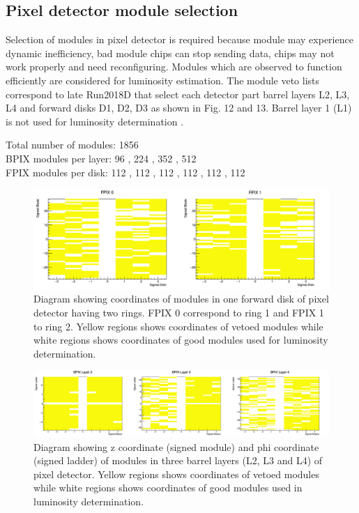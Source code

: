 \subsection{Pixel detector module selection}
Selection of modules in pixel detector is required because module may experience dynamic inefficiency, bad module chips can stop sending data, chips may not work properly and need reconfiguring. Modules which are observed to function efficiently are considered for luminosity estimation. The module veto lists correspond to late Run2018D that select each detector part barrel layers L2, L3, L4 and forward disks D1, D2, D3 as shown in Fig. 12 and 13. Barrel layer 1 (L1) is not used for luminosity determination \cite{vetolist}. \\

\begin{flushleft}
Total number of modules: 1856 \\
BPIX modules per layer:  96 , 224 , 352 , 512\\
FPIX modules per disk:  112 , 112 , 112 , 112 , 112 , 112\\
\end{flushleft}

\begin{figure}[H]
  \centering
  \includegraphics[width=0.8 \columnwidth]{./PDDisk_R12.png}
  \caption{ \onehalfspacing Diagram showing coordinates of modules in one forward disk of pixel detector having two rings. FPIX 0 correspond to ring 1 and FPIX 1 to ring 2. Yellow regions shows coordinates of vetoed modules while white regions shows coordinates of good modules used for luminosity determination.}
  \label{fig:CMS}
\end{figure}

\begin{figure}[H]
  \centering
  \includegraphics[width=1 \columnwidth]{./bpixL2-L4.png}
  \caption{ \onehalfspacing Diagram showing z coordinate (signed module) and phi coordinate (signed ladder) of modules in three barrel layers (L2, L3 and L4) of pixel detector. Yellow regions shows coordinates of vetoed modules while white regions shows coordinates of good modules used in luminosity determination. }
  \label{fig:CMS}
\end{figure}






